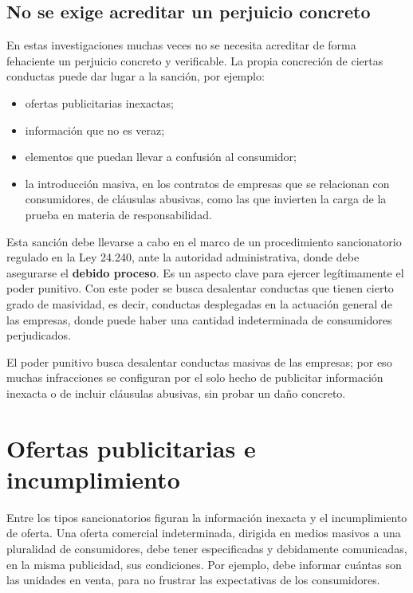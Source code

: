 \documentclass[12pt,oneside]{book}
\begin{document}

\subsection{No se exige acreditar un perjuicio concreto}

En estas investigaciones muchas veces no se necesita acreditar de forma fehaciente un perjuicio concreto y verificable. La propia concreción de ciertas conductas puede dar lugar a la sanción, por ejemplo:
\begin{itemize}
    \item ofertas publicitarias inexactas;
    \item información que no es veraz;
    \item elementos que puedan llevar a confusión al consumidor;
    \item la introducción masiva, en los contratos de empresas que se relacionan con consumidores, de cláusulas abusivas, como las que invierten la carga de la prueba en materia de responsabilidad.
\end{itemize}

Esta sanción debe llevarse a cabo en el marco de un procedimiento sancionatorio regulado en la Ley 24.240, ante la autoridad administrativa, donde debe asegurarse el \textbf{debido proceso}. Es un aspecto clave para ejercer legítimamente el poder punitivo. Con este poder se busca desalentar conductas que tienen cierto grado de masividad, es decir, conductas desplegadas en la actuación general de las empresas, donde puede haber una cantidad indeterminada de consumidores perjudicados.

\begin{important}
El poder punitivo busca desalentar conductas masivas de las empresas; por eso muchas infracciones se configuran por el solo hecho de publicitar información inexacta o de incluir cláusulas abusivas, sin probar un daño concreto.
\end{important}

\section{Ofertas publicitarias e incumplimiento}

Entre los tipos sancionatorios figuran la información inexacta y el incumplimiento de oferta. Una oferta comercial indeterminada, dirigida en medios masivos a una pluralidad de consumidores, debe tener especificadas y debidamente comunicadas, en la misma publicidad, sus condiciones. Por ejemplo, debe informar cuántas son las unidades en venta, para no frustrar las expectativas de los consumidores.
\end{document}
